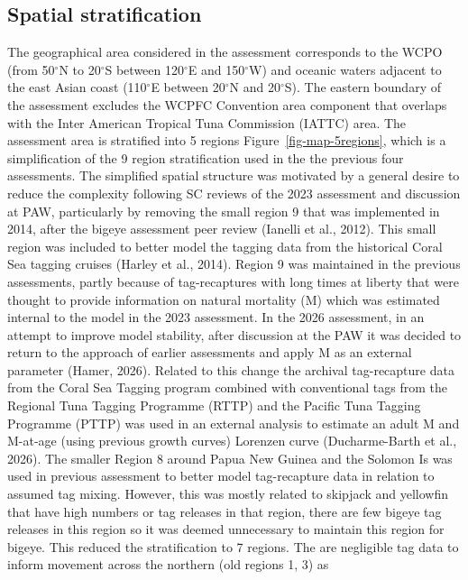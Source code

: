 \documentclass[
  english,
  a4paper,
  a4paper,
  11pt]{SCreport}
\begin{document}
\subsection{Spatial stratification}\label{sec-spatial-stratification}

The geographical area considered in the assessment corresponds to the
WCPO (from 50\(^\circ\)N to 20\(^\circ\)S between 120\(^\circ\)E and
150\(^\circ\)W) and oceanic waters adjacent to the east Asian coast
(110\(^\circ\)E between 20\(^\circ\)N and 20\(^\circ\)S). The eastern
boundary of the assessment excludes the WCPFC Convention area component
that overlaps with the Inter American Tropical Tuna Commission (IATTC)
area. The assessment area is stratified into 5 regions
Figure~\ref{fig-map-5regions}, which is a simplification of the 9 region
stratification used in the the previous four assessments. The simplified
spatial structure was motivated by a general desire to reduce the
complexity following SC reviews of the 2023 assessment and discussion at
PAW, particularly by removing the small region 9 that was implemented in
2014, after the bigeye assessment peer review (Ianelli et al., 2012).
This small region was included to better model the tagging data from the
historical Coral Sea tagging cruises (Harley et al., 2014). Region 9 was
maintained in the previous assessments, partly because of tag-recaptures
with long times at liberty that were thought to provide information on
natural mortality (M) which was estimated internal to the model in the
2023 assessment. In the 2026 assessment, in an attempt to improve model
stability, after discussion at the PAW it was decided to return to the
approach of earlier assessments and apply M as an external parameter
(Hamer, 2026). Related to this change the archival tag-recapture data
from the Coral Sea Tagging program combined with conventional tags from
the Regional Tuna Tagging Programme (RTTP) and the Pacific Tuna Tagging
Programme (PTTP) was used in an external analysis to estimate an adult M
and M-at-age (using previous growth curves) Lorenzen curve
(Ducharme-Barth et al., 2026). The smaller Region 8 around Papua New
Guinea and the Solomon Is was used in previous assessment to better
model tag-recapture data in relation to assumed tag mixing. However,
this was mostly related to skipjack and yellowfin that have high numbers
or tag releases in that region, there are few bigeye tag releases in
this region so it was deemed unnecessary to maintain this region for
bigeye. This reduced the stratification to 7 regions. The are negligible
tag data to inform movement across the northern (old regions 1, 3) as
\end{document}
